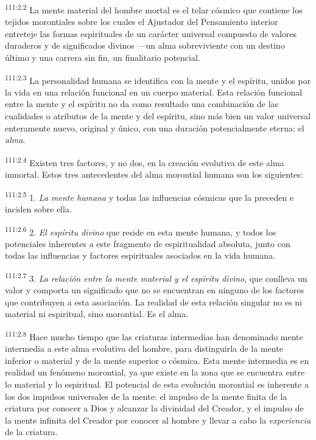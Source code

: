 \documentclass[twoside, 11pt]{book}
\begin{document}
\par
\textsuperscript{111:2.2} La mente material del hombre mortal es el telar cósmico que contiene los tejidos morontiales sobre los cuales el Ajustador del Pensamiento interior entreteje las formas espirituales de un carácter universal compuesto de valores duraderos y de significados divinos ---un alma sobreviviente con un destino último y una carrera sin fin, un finalitario potencial.

\par
\textsuperscript{111:2.3} La personalidad humana se identifica con la mente y el espíritu, unidos por la vida en una relación funcional en un cuerpo material. Esta relación funcional entre la mente y el espíritu no da como resultado una combinación de las cualidades o atributos de la mente y del espíritu, sino más bien un valor universal enteramente nuevo, original y único, con una duración potencialmente eterna: el \textit{alma}.

\par
\textsuperscript{111:2.4} Existen tres factores, y no dos, en la creación evolutiva de este alma inmortal. Estos tres antecedentes del alma morontial humana son los siguientes:

\par
\textsuperscript{111:2.5} 1. \textit{La mente humana} y todas las influencias cósmicas que la preceden e inciden sobre ella.

\par
\textsuperscript{111:2.6} 2. \textit{El espíritu divino} que reside en esta mente humana, y todos los potenciales inherentes a este fragmento de espiritualidad absoluta, junto con todas las influencias y factores espirituales asociados en la vida humana.

\par
\textsuperscript{111:2.7} 3. \textit{La relación entre la mente material y el espíritu divino}, que conlleva un valor y comporta un significado que no se encuentran en ninguno de los factores que contribuyen a esta asociación. La realidad de esta relación singular no es ni material ni espiritual, sino morontial. Es el alma.

\par
\textsuperscript{111:2.8} Hace mucho tiempo que las criaturas intermedias han denominado mente intermedia a este alma evolutiva del hombre, para distinguirla de la mente inferior o material y de la mente superior o cósmica. Esta mente intermedia es en realidad un fenómeno morontial, ya que existe en la zona que se encuentra entre lo material y lo espiritual. El potencial de esta evolución morontial es inherente a los dos impulsos universales de la mente: el impulso de la mente finita de la criatura por conocer a Dios y alcanzar la divinidad del Creador, y el impulso de la mente infinita del Creador por conocer al hombre y llevar a cabo la \textit{experiencia} de la criatura.
\end{document}
